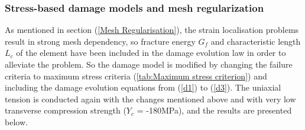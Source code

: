 \documentclass[12pt,a4paper,twoside,openright]{report}
\begin{document}
\subsubsection{Stress-based damage models and mesh regularization}
\indent\indent\indent As mentioned in section (\ref{Mesh Regularisation}), the strain localisation problems result in strong mesh dependency, so fracture energy $G_f$ and characteristic length $L_{c}$ of the element have been included in the damage evolution law in order to alleviate the problem. So the damage model is modified by changing the failure criteria to maximum stress criteria (\ref{tab:Maximum stress criterion}) and including the damage evolution equations from (\ref{d1}) to (\ref{d3}). The uniaxial tension is conducted again with the changes mentioned above and with very low transverse compression strength ($Y_{c}$ = -180MPa), and the results are presented below.
\end{document}
